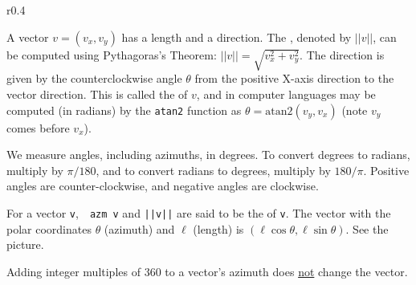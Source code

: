 \documentclass[12pt]{article}
\begin{document}
\begin{minipage}{\textwidth}\raggedright
\begin{wrapfigure}{r}{0.4\textwidth}
\end{wrapfigure}
A vector $v=(v_x,v_y)$ has a length and a direction.
The , denoted by $||v||$, can be computed using
Pythagoras's Theorem: $||v||=\sqrt{v_x^2+v_y^2}$.  The
direction is given by the counterclockwise angle $\theta$ from
the positive X-axis direction to the vector direction.
This is called the  of $v$, and in computer
languages may be computed (in radians) by the {\tt atan2} function as
$\theta = \mathrm{atan2}(v_y,v_x)$ (note $v_y$ comes before $v_x$).
\end{minipage}

We measure angles, including azimuths, in degrees.  To convert degrees
to radians, multiply by $\pi/180$, and to convert radians to degrees,
multiply by $180/\pi$.  Positive angles are counter-clockwise, and
negative angles are clockwise.

For a vector {\tt v},~~{\tt azm v} and {\tt ||v||} are said to be
the  of {\tt v}.
The vector with the polar coordinates $\theta$ (azimuth) and $\ell$ (length) is
$(\ell \cos\theta,\ell \sin\theta)$.
See the picture.

Adding integer multiples of 360 to a vector's
azimuth does \underline{not} change the vector.

\newpage
\end{document}
